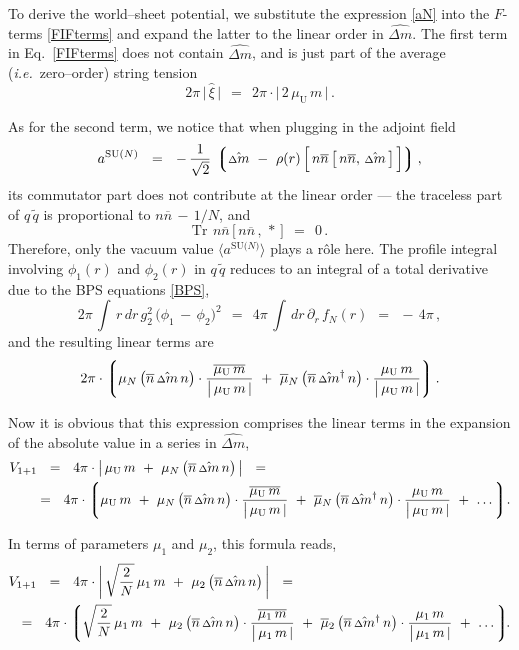 \documentclass[12pt]{article}
\def\beq{\begin{equation}}
\def\eeq{\end{equation}}
\newcommand{\p}{\partial}
\newcommand{\wt}{\widetilde}
\newcommand{\ov}{\overline}
\newcommand{\lgr}{\left\lgroup}
\newcommand{\rgr}{\right\rgroup}
\newcommand{\aN}{a^\text{SU($N$)}}
\newcommand{\nbar}{\ov{n}}
\newcommand{\nnbar}{n\ov{n}}
\newcommand{\muU}{\mu_\text{U}}
\newcommand{\qt}{\wt{q}}
\newcommand{\Tr}{\text{Tr}}
\newcommand{\dm}{\hat{{\scriptstyle \Delta} m}}
\newcommand{\dmdag}{\hat{{\scriptstyle \Delta} m}{}^\dag}
\newcommand{\ie}{{\it i.e.}~}
\begin{document}
	To derive the world--sheet potential, we substitute the expression \eqref{aN} into the $ F $-terms
	\eqref{FIFterms} and expand the latter to the linear order in $ \dm $.
	The first term in Eq.~\eqref{FIFterms} does not contain $ \dm $, 
	and is just part of the average (\ie zero--order) string tension
\beq
\label{avtension}
	2 \pi\, \big|\, \hat{\xi} \,\big|    ~~=~~    2 \pi \cdot \Big|\, 2\, \muU\, m \,\Big| \,.
\eeq
	
	As for the second term, we notice that when plugging in the adjoint field 
\[
	\aN    ~~=~~    
	-\, \frac{1}{\sqrt{2}}\, 
	\lgr \dm  ~-~  \rho(r)\, \Big[\, \nnbar\, \big[\, \nnbar,\, \dm \,\big] \,\Big] \rgr,
\]
	its commutator part does not contribute at the linear order --- 
	the traceless part of $ q\, \qt $ is proportional to $ \nnbar \,-\, 1/N $, and
\[
	\Tr~\, \nnbar \, \big[\, \nnbar \,,\, * \,\big]    ~~=~~    0\,.
\]
	Therefore, only the vacuum value $ \langle \aN \rangle $ plays a r\^ole here.
	The profile integral involving $ \phi_1(r) $ and $ \phi_2(r) $ in $ q\, \qt $
	reduces to an integral of a total derivative due to the BPS equations \eqref{BPS},
\[
	2\pi\, \int\, r\, dr\, g_2^2\, \big( \phi_1 \,-\, \phi_2 \big)^2    ~~=~~
	4\pi\, \int\, dr\, \p_r\, f_N(r)    ~~=~~    -\, 4\pi\,,
\] 
	and the resulting linear terms are   
\beq
	2\pi \cdot 
	\lgr
		\mu_N\, \big(\nbar\, \dm\, n\big) \cdot \frac{\ov{\muU\, m}}{\big|\, \muU\, m \,|}
		~+~
		\ov{\mu}{}_N\, \big(\nbar\, \dmdag\, n\big) \cdot \frac{\muU\, m}{\big|\, \muU\, m \,|}
	\rgr.
\eeq

	Now it is obvious that this expression comprises the linear terms in the expansion of
	the absolute value in a series in $ \dm $,
\begin{align}
%
	&
	V_{1+1}    ~~=~~    4 \pi \cdot \big|\, \muU\, m  ~+~  \mu_N\, \big(\nbar\, \dm\, n\big) \,\big|    ~~=~~    
	\\
%
\notag
	&
	\quad~
	~~=~~
	4 \pi \cdot 
	\lgr
		\muU\, m  
		~+~
		\mu_N\, \big(\nbar\, \dm\, n\big) \cdot \frac{\ov{\muU\, m}}{\big|\, \muU\, m \,|}
		~+~
		\ov{\mu}{}_N\, \big(\nbar\, \dmdag\, n\big) \cdot \frac{\muU\, m}{\big|\, \muU\, m \,|}
		~+~
		\dots
	\rgr\!.
\end{align}

	In terms of parameters $ \mu_1 $ and $ \mu_2 $, this formula reads,
\begin{align}
%
	&
	V_{1+1}    ~~=~~    4 \pi \cdot \bigg|\, \sqrt{\frac{2}{N}}\,\mu_1\, m  ~+~  \mu_2\, \big(\nbar\, \dm\, n\big) \,\bigg|    ~~=~~    
	\\
%
\notag
	&
	~~=~~
	4 \pi \cdot 
	\lgr
		\sqrt{\frac{2}{N}}\,\mu_1\, m  
		~+~
		\mu_2\, \big(\nbar\, \dm\, n\big) \cdot \frac{\ov{\mu_1\, m}}{\big|\, \mu_1\, m \,|}
		~+~
		\ov{\mu}{}_2\, \big(\nbar\, \dmdag\, n\big) \cdot \frac{\mu_1\, m}{\big|\, \mu_1\, m \,|}
		~+~
		\dots
	\rgr\!\!.
\end{align}
\end{document}
